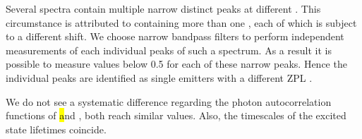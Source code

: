 		Several \nd \pl spectra contain multiple narrow distinct peaks at different \wls.
		This circumstance is attributed to \nds containing more than one \siv, each of which is subject to a different \ZPL \wl shift.
		We choose narrow bandpass filters to perform independent measurements of each individual peaks of such a spectrum.
		As a result it is possible to measure \gtz values below \num{0.5} for each of these narrow peaks.
		Hence the individual peaks are identified as single emitters with a different ZPL \cwl.
		
		We do not see a systematic difference regarding the photon autocorrelation functions of \hl and \vl, both reach similar \gtz values.
		Also, the timescales of the excited state lifetimes coincide.
